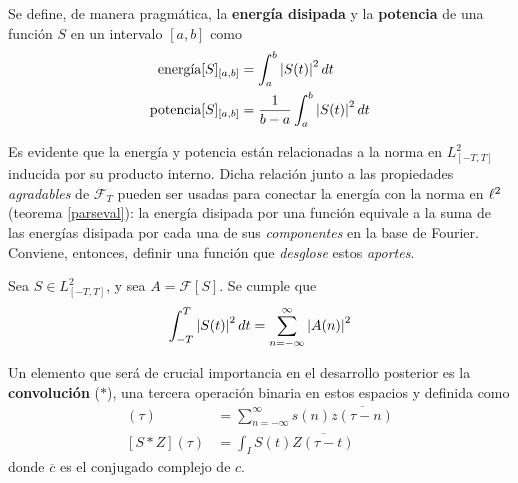Se define, de manera pragmática, la \textbf{energía disipada} y la \textbf{potencia} de una función 
$S$ en un intervalo $[a,b]$ como 
\begin{align}
\text{energía}[S]_{[a,b]} &= \int_a^{b} \left| S(t) \right|^{2} dt \nonumber \\
\text{potencia}[S]_{[a,b]} &= \frac{1}{b-a} \int_a^{b} \left| S(t) \right|^{2} dt
\label{energia}
\end{align}

Es evidente que la energía y potencia están relacionadas a la norma en $L^{2}_{[-T,T]}$ inducida por
su producto interno.
%
Dicha relación junto a las propiedades \textit{agradables} de $\mathcal{F}_T$ pueden ser usadas 
para conectar la energía con la norma en $\ell^{2}$ (teorema \ref{parseval}): la energía disipada por 
una función equivale a la suma de las energías disipada por cada una de sus \textit{componentes} en 
la base de Fourier.
%
Conviene, entonces, definir una función que \textit{desglose} estos \textit{aportes}.

\begin{teorema}[Parseval]
Sea $S \in L^{2}_{[-T,T]}$, y sea $A = \mathcal{F}[S]$. Se cumple que
\begin{equation*}
\int_{-T}^{T} \left| S(t) \right|^{2} dt = \sum_{n=-\infty}^{\infty} \left| A(n) \right|^{2}
\end{equation*}
\label{parseval}
\end{teorema}


Un elemento que será de crucial importancia en el desarrollo posterior es la \textbf{convolución} 
($\ast$), una tercera operación binaria en estos espacios y definida como
%
\begin{align*}
[s \ast z] (\tau) &= \sum_{n=-\infty}^{\infty} s(n) \overline{z(\tau-n)} \\
[S \ast Z] (\tau) &= \int_I S(t) \overline{Z(\tau-t)}
\end{align*}
%
donde $\overline{c}$ es el conjugado complejo de $c$. 
%

